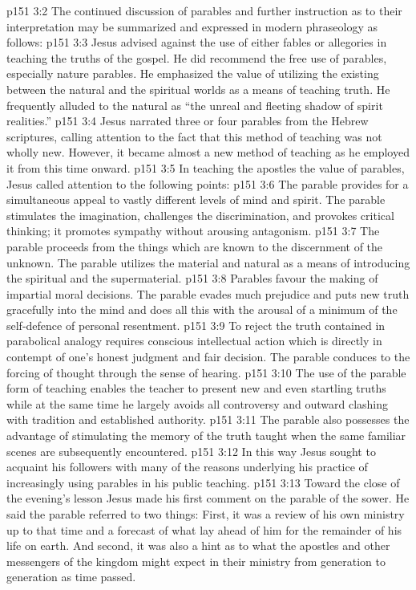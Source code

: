 \vs p151 3:2 \pc The continued discussion of parables and further instruction as to their interpretation may be summarized and expressed in modern phraseology as follows:
\vs p151 3:3 \bibnobreakspace Jesus advised against the use of either fables or allegories in teaching the truths of the gospel. He did recommend the free use of parables, especially nature parables. He emphasized the value of utilizing the  existing between the natural and the spiritual worlds as a means of teaching truth. He frequently alluded to the natural as “the unreal and fleeting shadow of spirit realities.”
\vs p151 3:4 \bibnobreakspace Jesus narrated three or four parables from the Hebrew scriptures, calling attention to the fact that this method of teaching was not wholly new. However, it became almost a new method of teaching as he employed it from this time onward.
\vs p151 3:5 \bibnobreakspace In teaching the apostles the value of parables, Jesus called attention to the following points:
\vs p151 3:6 The parable provides for a simultaneous appeal to vastly different levels of mind and spirit. The parable stimulates the imagination, challenges the discrimination, and provokes critical thinking; it promotes sympathy without arousing antagonism.
\vs p151 3:7 The parable proceeds from the things which are known to the discernment of the unknown. The parable utilizes the material and natural as a means of introducing the spiritual and the supermaterial.
\vs p151 3:8 Parables favour the making of impartial moral decisions. The parable evades much prejudice and puts new truth gracefully into the mind and does all this with the arousal of a minimum of the self\hyp{}defence of personal resentment.
\vs p151 3:9 To reject the truth contained in parabolical analogy requires conscious intellectual action which is directly in contempt of one’s honest judgment and fair decision. The parable conduces to the forcing of thought through the sense of hearing.
\vs p151 3:10 The use of the parable form of teaching enables the teacher to present new and even startling truths while at the same time he largely avoids all controversy and outward clashing with tradition and established authority.
\vs p151 3:11 The parable also possesses the advantage of stimulating the memory of the truth taught when the same familiar scenes are subsequently encountered.
\vs p151 3:12 \pc In this way Jesus sought to acquaint his followers with many of the reasons underlying his practice of increasingly using parables in his public teaching.
\vs p151 3:13 \pc Toward the close of the evening’s lesson Jesus made his first comment on the parable of the sower. He said the parable referred to two things: First, it was a review of his own ministry up to that time and a forecast of what lay ahead of him for the remainder of his life on earth. And second, it was also a hint as to what the apostles and other messengers of the kingdom might expect in their ministry from generation to generation as time passed.
